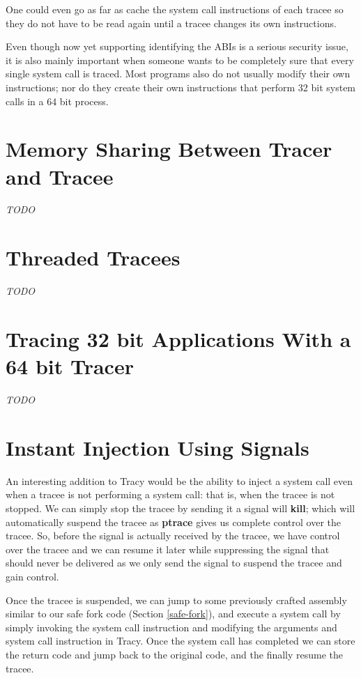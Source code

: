 \documentclass[a4paper, 10pt]{report}
\begin{document}
One could even go as far as cache the system call instructions of each tracee
so they do not have to be read again until a tracee changes its own
instructions.

Even though now yet supporting identifying the ABIs is a serious security issue,
it is also mainly important when someone wants to be completely sure that every
single system call is traced. Most programs also do not usually modify their
own instructions; nor do they create their own instructions that perform 32 bit
system calls in a 64 bit process.

\section{Memory Sharing Between Tracer and Tracee}
\label{memory-share}

\textit{TODO}


\section{Threaded Tracees}
\label{future-threaded-tracees}
\textit{TODO}

\section{Tracing 32 bit Applications With a 64 bit Tracer}
\label{diff-abi-trace}
\textit{TODO}

\section{Instant Injection Using Signals}
\label{instant-inject}

An interesting addition to Tracy would be the ability to inject a system call
even when a tracee is not performing a system call: that is, when the tracee
is not stopped. We can simply stop the tracee by sending it a signal will
\textbf{kill}; which will automatically suspend the tracee as
\textbf{ptrace} gives us complete control over the tracee.
So, before the signal is actually received by the tracee, we have control
over the tracee and we can resume it later while suppressing the signal that
should never be delivered as we only send the signal to suspend the tracee and
gain control.

Once the tracee is suspended, we can jump to some previously crafted assembly
similar to our safe fork code (Section \ref{safe-fork}), and execute a system
call by simply invoking the system call instruction and modifying the
arguments and system call instruction in Tracy. Once the system call
has completed we can store the return code and jump back to the original code,
and the finally resume the tracee.
\end{document}
